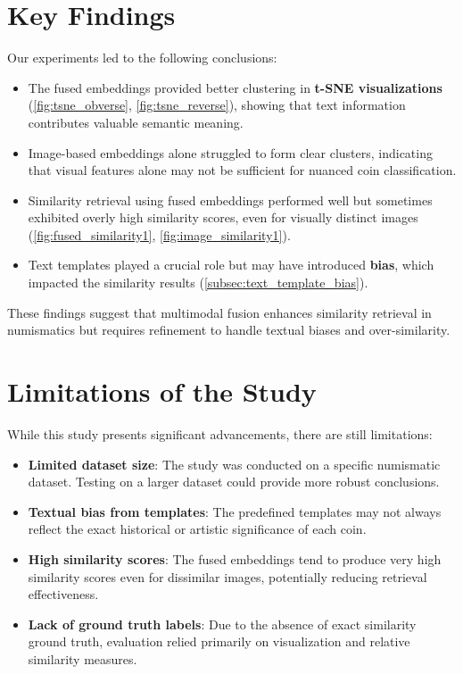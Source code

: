\documentclass[nolibertine, english, algorithm, nomencl, minted]{ttlab-qualify}
\begin{document}
\section{Key Findings}
\label{sec:key_findings}

Our experiments led to the following conclusions:
\begin{itemize}
    \item The fused embeddings provided better clustering in 
    \textbf{t-SNE visualizations} (\ref{fig:tsne_obverse}, \ref{fig:tsne_reverse}), 
    showing that text information contributes valuable semantic meaning.
    \item Image-based embeddings alone struggled to form clear clusters, indicating that visual features alone may not be 
    sufficient for nuanced coin classification.
    \item Similarity retrieval using fused embeddings performed well but sometimes exhibited overly high similarity scores,
    even for visually distinct images (\ref{fig:fused_similarity1}, \ref{fig:image_similarity1}).
    \item Text templates played a crucial role but may have introduced \textbf{bias}, 
    which impacted the similarity results (\ref{subsec:text_template_bias}).
\end{itemize}

These findings suggest that multimodal fusion enhances similarity retrieval in numismatics but requires refinement to 
handle textual biases and over-similarity.

\section{Limitations of the Study}
\label{sec:limitations_conclusion}

While this study presents significant advancements, there are still limitations:
\begin{itemize}
    \item \textbf{Limited dataset size}: The study was conducted on a specific numismatic dataset. 
    Testing on a larger dataset could provide more robust conclusions.
    \item \textbf{Textual bias from templates}: The predefined templates may not always reflect the exact historical or 
    artistic significance of each coin.
    \item \textbf{High similarity scores}: The fused embeddings tend to produce very high similarity scores even 
    for dissimilar images, potentially reducing retrieval effectiveness.
    \item \textbf{Lack of ground truth labels}: Due to the absence of exact similarity ground truth, 
    evaluation relied primarily on visualization and relative similarity measures.
\end{itemize}
\end{document}
